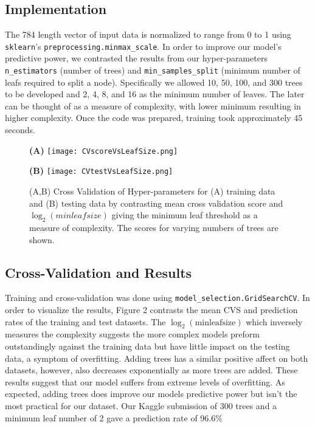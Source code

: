 \documentclass{article}
\begin{document}
\subsection{Implementation}
The 784 length vector of input data is normalized to range from 0 to 1 using \verb+sklearn+'s \verb+preprocessing.minmax_scale+. In order to improve our model's predictive power, we contrasted the results from our hyper-parameters \verb+n_estimators+ (number of trees) and  \verb+min_samples_split+ (minimum number of leafs required to split a node). Specifically we allowed 10, 50, 100, and 300 trees to be developed and 2, 4, 8, and 16 as the minimum number of leaves. The later can be thought of as a measure of complexity, with lower minimum resulting in higher complexity. Once the code was prepared, training took approximately 45 seconds.
\begin{figure}[h]
    \centering
    \begin{minipage}[t]{0.45\textwidth}
        \centering
        \textbf{(A)}
        \texttt{[image: CVscoreVsLeafSize.png]}
    \end{minipage}
    \begin{minipage}[t]{0.45\textwidth}
        \centering
        \textbf{(B)}
        \texttt{[image: CVtestVsLeafSize.png]}
    \end{minipage}
\caption{(A,B) Cross Validation of Hyper-parameters for (A) training data and (B) testing data by contrasting mean cross validation score and $\log_2(minleafsize)$ giving the minimum leaf threshold as a measure of complexity. The scores for varying numbers of trees are shown.}
\end{figure}

\subsection{Cross-Validation and Results}
Training and cross-validation was done using \verb+model_selection.GridSearchCV+. In order to visualize the results, Figure 2 contrasts the mean CVS and prediction rates of the training and test datasets. The $\log_2(\text{minleafsize})$ which inversely measures the complexity suggests the more complex models preform outstandingly against the training data but have little impact on the testing data, a symptom of overfitting. Adding trees has a similar positive affect on both datasets, however, also decreases exponentially as more trees are added. These results suggest that our model suffers from extreme levels of overfitting. As expected, adding trees does improve our models predictive power but isn't the most practical for our dataset. Our Kaggle submission of 300 trees and a minimum leaf number of 2 gave a prediction rate of 96.6\%
\end{document}
